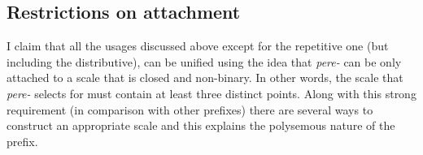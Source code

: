
\subsection{Restrictions on attachment}
I claim that all the usages discussed above except for the repetitive one (but including the distributive), can be unified using the idea that \textit{pere-} can be only attached to a scale that is closed and non-binary. In other words, the scale that \textit{pere-} selects for must contain at least three distinct points. Along with this strong requirement (in comparison with other prefixes) there are several ways to construct an appropriate scale and this explains the polysemous nature of the prefix. 

